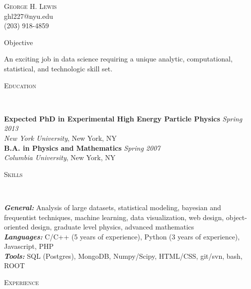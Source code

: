 \documentclass[9pt]{article}
\newenvironment{changemargin}[2]{%
  \begin{list}{}{%
    \setlength{\topsep}{0pt}%
    \setlength{\leftmargin}{#1}%
    \setlength{\rightmargin}{#2}%
    \setlength{\listparindent}{\parindent}%
    \setlength{\itemindent}{\parindent}%
    \setlength{\parsep}{\parskip}%
  }%
  \item[]}{\end{list}
}
\newcommand{\lineover}{
	\begin{changemargin}{-0.05in}{-0.05in}
		\vspace*{-8pt}
		\hrulefill \\
		\vspace*{-2pt}
	\end{changemargin}
}
\newcommand{\header}[1]{
	\begin{changemargin}{-0.5in}{-0.5in}
		\scshape{#1}\\
  	\lineover
	\end{changemargin}
}
\newcommand{\contact}[4]{
	\begin{changemargin}{-0.5in}{-0.5in}
		\begin{center}
			{\Large \scshape {#1}}\\ \smallskip
			{#2}\\ \smallskip 
			{#3}\\ \smallskip
			{#4}\smallskip
		\end{center}
	\end{changemargin}
}
\newenvironment{body} {
	\vspace*{-16pt}
	\begin{changemargin}{-0.25in}{-0.5in}
  }	
	{\end{changemargin}
}
\begin{document}
\contact{George H. Lewis}{ghl227@nyu.edu}{(203) 918-4859}


\header{Objective}
\begin{body}
	\vspace{14pt}
	An exciting job in data science requiring a unique analytic, computational, statistical, and technologic skill set.
\end{body}

\smallskip


\header{Education}

\begin{body}
	\vspace{14pt}
	\textbf{Expected PhD in Experimental High Energy Particle Physics }{} \hfill \emph{Spring 2013}{} \\
	\emph{New York University}, New York, NY{} \\
  \medskip
	\textbf{B.A. in Physics and Mathematics} \hfill \emph{Spring 2007} \\
	\emph{Columbia University}, New York, NY\\
\end{body}

\smallskip


\header{Skills}

\begin{body}
	\vspace{14pt}
        \emph{\textbf{General:}}{} Analysis of large datasets, statistical modeling, bayesian and frequentist techniques, machine learning, data visualization, web design, object-oriented design, graduate level physics, advanced mathematics \\
        \smallskip
	\emph{\textbf{Languages:}}{} C/C++ (5 years of experience),  Python (3 years of experience), Javascript, PHP \\
        \smallskip
        \emph{\textbf{Tools:}}{} SQL (Postgres), MongoDB, Numpy/Scipy, HTML/CSS, git/svn, bash, ROOT \\
\end{body}

\smallskip

\header{Experience}
\end{document}
